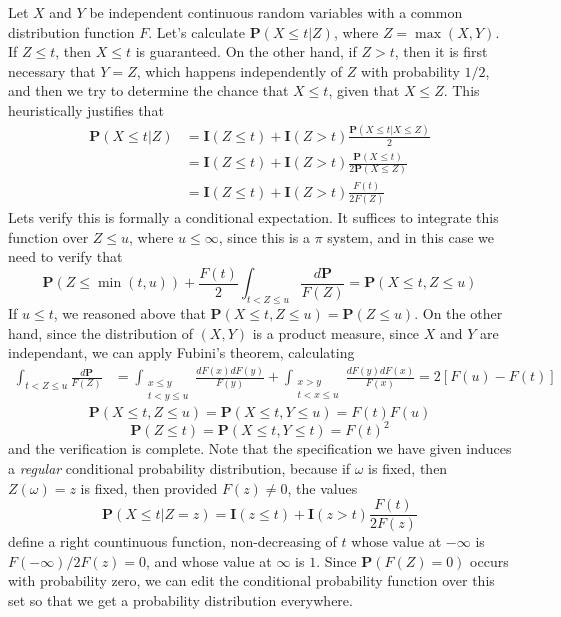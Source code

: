 \begin{example}
    Let $X$ and $Y$ be independent continuous random variables with a common distribution function $F$. Let's calculate $\mathbf{P}(X \leq t | Z)$, where $Z = \max(X,Y)$. If $Z \leq t$, then $X \leq t$ is guaranteed. On the other hand, if $Z > t$, then it is first necessary that $Y = Z$, which happens independently of $Z$ with probability $1/2$, and then we try to determine the chance that $X \leq t$, given that $X \leq Z$. This heuristically justifies that
    \begin{align*}
        \mathbf{P}(X \leq t | Z) &= \mathbf{I}(Z \leq t) + \mathbf{I}(Z > t) \frac{\mathbf{P}(X \leq t | X \leq Z)}{2} \\
        &= \mathbf{I}(Z \leq t) + \mathbf{I}(Z > t) \frac{\mathbf{P}(X \leq t)}{2 \mathbf{P}(X \leq Z)}\\
        &= \mathbf{I}(Z \leq t) + \mathbf{I}(Z > t) \frac{F(t)}{2 F(Z)}
    \end{align*}
    Lets verify this is formally a conditional expectation. It suffices to integrate this function over $Z \leq u$, where $u \leq \infty$, since this is a $\pi$ system, and in this case we need to verify that
    \[ \mathbf{P}(Z \leq \min(t,u)) + \frac{F(t)}{2} \int_{t < Z \leq u} \frac{d\mathbf{P}}{F(Z)} = \mathbf{P}(X \leq t, Z \leq u) \]
    If $u \leq t$, we reasoned above that $\mathbf{P}(X \leq t, Z \leq u) = \mathbf{P}(Z \leq u)$. On the other hand, since the distribution of $(X,Y)$ is a product measure, since $X$ and $Y$ are independant, we can apply Fubini's theorem, calculating
    \begin{align*}
        \int_{t < Z \leq u} \frac{d\mathbf{P}}{F(Z)} &= \int_{\substack{x \leq y\\t < y \leq u}} \frac{dF(x) dF(y)}{F(y)} + \int_{\substack{x > y\\t < x \leq u}} \frac{dF(y) dF(x)}{F(x)}= 2[F(u) - F(t)]
    \end{align*}
    \[ \mathbf{P}(X \leq t, Z \leq u) = \mathbf{P}(X \leq t, Y \leq u) = F(t)F(u) \]
    \[ \mathbf{P}(Z \leq t) = \mathbf{P}(X \leq t, Y \leq t) = F(t)^2 \]
    and the verification is complete. Note that the specification we have given induces a {\it regular} conditional probability distribution, because if $\omega$ is fixed, then $Z(\omega) = z$ is fixed, then provided $F(z) \neq 0$, the values
    \[ \mathbf{P}(X \leq t|Z = z) = \mathbf{I}(z \leq t) + \mathbf{I}(z > t) \frac{F(t)}{2F(z)} \]
    define a right countinuous function, non-decreasing of $t$ whose value at $-\infty$ is $F(-\infty)/2F(z) = 0$, and whose value at $\infty$ is $1$. Since $\mathbf{P}(F(Z) = 0)$ occurs with probability zero, we can edit the conditional probability function over this set so that we get a probability distribution everywhere.
\end{example}

